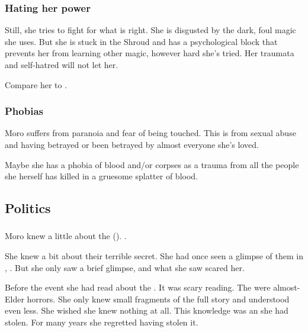 \subsubsection{Hating her power}
Still, she tries to fight for what is right. She is disgusted by the dark, foul magic she uses. But she is stuck in the Shroud and has a psychological block that prevents her from learning other magic, however hard she's tried. Her traumata and self-hatred will not let her. 

Compare her to \SailorNothing. 





\subsubsection{Phobias}
Moro suffers from paranoia and fear of being touched. This is from sexual abuse and having betrayed or been betrayed by almost everyone she's loved. 

Maybe she has a phobia of blood and/or corpses as a trauma from all the people she herself has killed in a gruesome splatter of blood. 









\subsection{Politics}





\subsubsection{\QuilJaaran}
Moro \Cornel knew a little about the \quiljaaran (\quo{\serpentmen}). 
. 

She knew a bit about their terrible secret. 
She had once seen a glimpse of them in \Yormis, .
But she only saw a brief glimpse, and what she saw scared her.

Before the event she had read about the \serpentmen.
It was scary reading.
The \serpentmen were almost-\scathaese Elder horrors.
She only knew small fragments of the full story and understood even less.
She wished she knew nothing at all. 
This knowledge was an \arcanum she had stolen. 
For many years she regretted having stolen it. 

